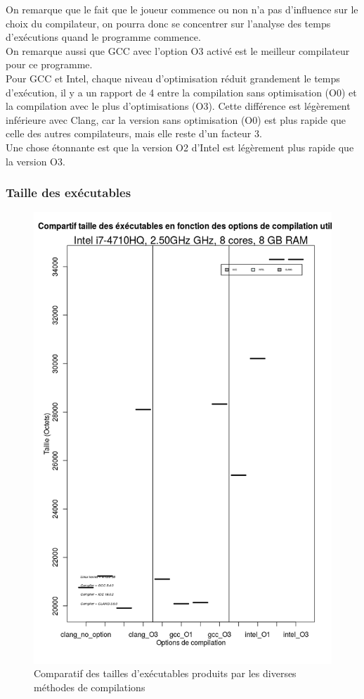 \documentclass[
 aip,
 jmp,
 amsmath,amssymb,
 reprint
]{revtex4-1}
\begin{document}
On remarque que le fait que le joueur commence ou non n'a pas d'influence sur le choix du compilateur, on pourra donc se concentrer sur l'analyse des temps d'exécutions quand le programme commence.\\
On remarque aussi que GCC avec l'option O3 activé est le meilleur compilateur pour ce programme.\\
Pour GCC et Intel, chaque niveau d'optimisation réduit grandement le temps d'exécution, il y a un rapport de 4 entre la compilation sans optimisation (O0) et la compilation avec le plus d'optimisations (O3). Cette différence est légèrement inférieure avec Clang, car la version sans optimisation (O0) est plus rapide que celle des autres compilateurs, mais elle reste d'un facteur 3.\\
Une chose étonnante est que la version O2 d'Intel est légèrement plus rapide que la version O3.\\

\subsubsection{Taille des exécutables}
\begin{figure}[H]
  \includegraphics[width=\linewidth, keepaspectratio=true]{sizes.png}
  \caption{Comparatif des tailles d'exécutables produits par les diverses méthodes de compilations\label{Fig:taille_executables_seq}}
\end{figure}
\end{document}
